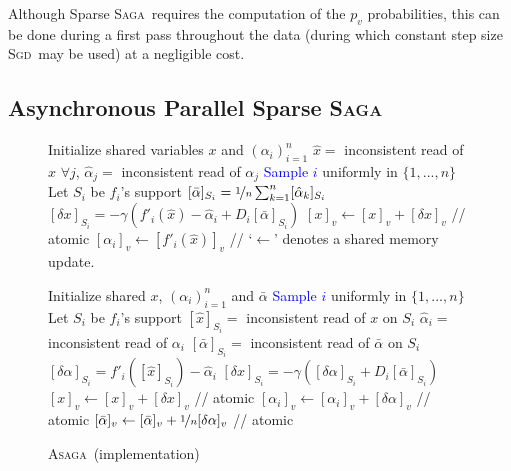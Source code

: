 \documentclass[twoside, 11pt]{article}
\newcommand{\stepsize}{\gamma}
\newcommand{\ASAGA}{\textsc{Asaga}}
\newcommand{\SAGA}{\textsc{Saga}}
\newcommand{\SGD}{\textsc{Sgd}}
\begin{document}
Although Sparse \SAGA\ requires the computation of the $p_v$ probabilities, this can be done during a first pass throughout the data (during which constant step size \SGD\ may be used) at a negligible cost.

\subsection{Asynchronous Parallel Sparse \SAGA} \label{sec:ASAGA} \label{ssec:convergence}

\begin{figure}[ttt!]
 \begin{minipage}[t]{0.49\textwidth}
   \begin{algorithm}[H]
     \caption{\ASAGA\ (analyzed algorithm)}
     \label{alg:theoretical}
     \label{theoreticalgo}
     \begin{algorithmic}[1]
	   \STATE Initialize shared variables $x$ and $(\alpha_i)_{i=1}^n$
	   \LOOP
	      \STATE $\hat x = $ inconsistent read of $x$
		  \STATE $\forall j$, $\hat \alpha_j = $ inconsistent read of $\alpha_j$
	   	  \STATE \textcolor{blue}{Sample $i$}  uniformly in $\{1,...,n\}$
	      \STATE Let $S_i$ be $f_i$'s support
	      \STATE $[\bar \alpha]_{S_i} = \nicefrac{1}{n} \sum_{k=1}^n [\hat \alpha_k]_{S_i}$
	      \STATE
    	  \STATE $[\delta x]_{S_i} = -\stepsize (f'_i(\hat x) - \hat \alpha_i + D_{i} [\bar \alpha]_{S_i})$
        		 \STATE $[x]_v \leftarrow [x]_v + [\delta x]_v$      \hfill // atomic
	         \STATE $[\alpha_i]_v \leftarrow [f'_i( \hat x )]_v$
	         \STATE  // {\small `$\gets$' denotes a shared memory update.}
    		  \ENDFOR
	   \ENDLOOP
	  \end{algorithmic}
    \end{algorithm}
 \end{minipage}
 \hfill
 \begin{minipage}[t]{0.5\textwidth}
    \begin{algorithm}[H]
      \caption{\ASAGA\ (implementation)}
      \label{alg:sagasync}
      \begin{algorithmic}[1]
	    \STATE Initialize shared $x$, $(\alpha_i)_{i=1}^n$ and $\bar \alpha$
	    \LOOP
	      \STATE \textcolor{blue}{Sample $i$} uniformly in $\{1,...,n\}$
  	      \STATE Let $S_i$ be $f_i$'s support
 	      \STATE $[\hat x]_{S_i} = $ inconsistent read of $x$ on $S_i$
	      \STATE $\hat \alpha_i = $ inconsistent read of $\alpha_i$
	      \STATE $[\bar \alpha]_{S_i} = $ inconsistent read of $\bar \alpha$ on $S_i$
	      \STATE $[\delta \alpha]_{S_i} = f'_i([\hat x]_{S_i}) - \hat \alpha_i$
	      \STATE $[\delta x]_{S_i} = - \gamma ([\delta\alpha]_{S_i} + D_i [\bar \alpha]_{S_i})$
		      \STATE $[x]_v \gets [x]_v + [\delta x]_v$  \hfill // atomic
		      \STATE $[\alpha_i]_v \gets [\alpha_i]_v + [\delta \alpha]_v$ \hfill // atomic
	   	      \STATE $[\bar \alpha]_v \gets [\bar \alpha]_v + \nicefrac{1}{n}[\delta \alpha]_v$ \hfill // atomic
   	      \ENDFOR
	   \ENDLOOP
      \end{algorithmic}
    \end{algorithm}
 \end{minipage}
\end{figure}
\end{document}
